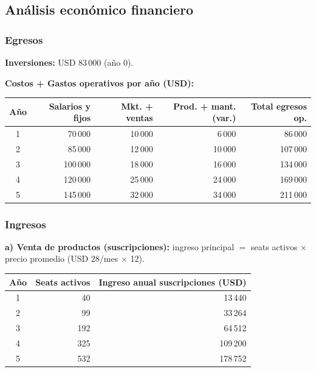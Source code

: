 \subsection{Análisis económico financiero}

\subsubsection{Egresos}
\textbf{Inversiones:} USD 83\,000 (año 0).

\noindent\textbf{Costos + Gastos operativos por año (USD):}

\begin{table}[ht]
  \centering
  \begin{tabular}{c r r r r}
    \toprule
    \textbf{Año} & \textbf{Salarios y fijos} & \textbf{Mkt. + ventas} & \textbf{Prod. + mant. (var.)} & \textbf{Total egresos op.} \\
    \midrule
    1 & 70\,000  & 10\,000 & 6\,000  & 86\,000  \\
    2 & 85\,000  & 12\,000 & 10\,000 & 107\,000 \\
    3 & 100\,000 & 18\,000 & 16\,000 & 134\,000 \\
    4 & 120\,000 & 25\,000 & 24\,000 & 169\,000 \\
    5 & 145\,000 & 32\,000 & 34\,000 & 211\,000 \\
    \bottomrule
  \end{tabular}
\end{table}

\subsubsection{Ingresos}
\textbf{a) Venta de productos (suscripciones):} ingreso principal $=$ seats activos
$\times$ precio promedio (USD 28/mes $\times$ 12).

\begin{table}[ht]
  \centering
  \begin{tabular}{c r r}
    \toprule
    \textbf{Año} & \textbf{Seats activos} & \textbf{Ingreso anual suscripciones (USD)} \\
    \midrule
    1 & 40  & 13\,440  \\
    2 & 99  & 33\,264  \\
    3 & 192 & 64\,512  \\
    4 & 325 & 109\,200 \\
    5 & 532 & 178\,752 \\
    \bottomrule
  \end{tabular}
\end{table}

